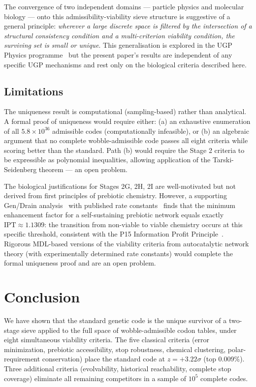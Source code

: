 \documentclass[10pt,twocolumn]{article}
\begin{document}
The convergence of two independent domains --- particle physics and molecular
biology --- onto this admissibility-viability sieve structure is suggestive of a
general principle: \emph{wherever a large discrete space is filtered by the
intersection of a structural consistency condition and a multi-criterion viability
condition, the surviving set is small or unique}. This generalisation is explored
in the UGP Physics programme~\cite{SpivackUGP,SpivackResearchProgrammes} but the present paper's results are
independent of any specific UGP mechanisms and rest only on the biological criteria
described here.

\subsection{Limitations}

The uniqueness result is computational (sampling-based) rather than analytical.
A formal proof of uniqueness would require either: (a) an exhaustive enumeration
of all $5.8 \times 10^{36}$ admissible codes (computationally infeasible), or
(b) an algebraic argument that no complete wobble-admissible code passes all
eight criteria while scoring better than the standard. Path (b) would require
the Stage 2 criteria to be expressible as polynomial inequalities, allowing
application of the Tarski-Seidenberg theorem --- an open problem.

The biological justifications for Stages 2G, 2H, 2I are well-motivated but
not derived from first principles of prebiotic chemistry. However, a
supporting Gen/Drain analysis~\cite{codon_code} with published rate
constants~\cite{Rode1999,Orgel1992} finds that the minimum enhancement
factor for a self-sustaining prebiotic network equals exactly
$\mathrm{IPT} \approx 1.1309$: the transition from non-viable to viable
chemistry occurs at this specific threshold, consistent with the P15
Information Profit Principle~\cite{SpivackIPT}.
Rigorous MDL-based versions of the viability criteria from autocatalytic
network theory (with experimentally determined rate constants) would
complete the formal uniqueness proof and are an open problem.

\section{Conclusion}

We have shown that the standard genetic code is the unique survivor of a
two-stage sieve applied to the full space of wobble-admissible codon tables,
under eight simultaneous viability criteria. The five classical criteria
(error minimization, prebiotic accessibility, stop robustness, chemical
clustering, polar-requirement conservation) place the standard code at
$z = +3.22\sigma$ (top 0.009\%). Three additional criteria (evolvability,
historical reachability, complete stop coverage) eliminate all remaining
competitors in a sample of $10^5$ complete codes.
\end{document}
